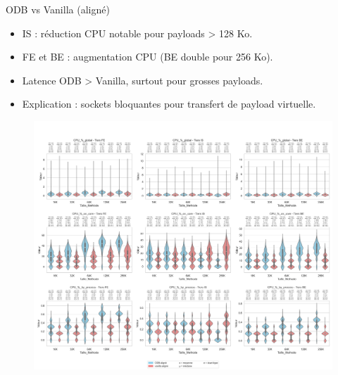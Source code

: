 \documentclass[aspectratio=43,8pt]{beamer}
\begin{document}
\begin{frame}{ODB vs Vanilla (aligné)}
\begin{itemize}
    \item IS : réduction CPU notable pour payloads > 128 Ko.
    \item FE et BE : augmentation CPU (BE double pour 256 Ko).
    \item Latence ODB > Vanilla, surtout pour grosses payloads.
    \item Explication : sockets bloquantes pour transfert de payload virtuelle.
\end{itemize}
\begin{figure}
    \includegraphics[width=\textwidth]{results/results-cmp/odb_dynamic_vs_vanilla_aligned.png}
\end{figure}
\end{frame}
\end{document}
